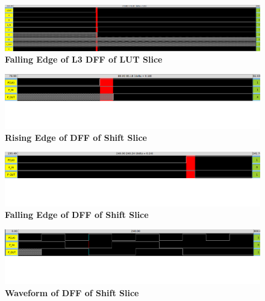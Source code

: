 \documentclass[a4paper]{article}
\begin{document}
    \begin{figure}[H]
        \centering
        \includegraphics[width=\textwidth,height=\textheight,keepaspectratio]{../../irsim/pics/lut_l3_falling.png}
        \caption{\textbf{Falling Edge of L3 DFF of LUT Slice}}
        \label{fig:gg}
    \end{figure}

    \begin{figure}[H]
        \centering
        \includegraphics[width=\textwidth,height=\textheight,keepaspectratio]{../../irsim/pics/shift_rising.png}
        \caption{\textbf{Rising Edge of DFF of Shift Slice}}
        \label{fig:gg}
    \end{figure}
    \begin{figure}[H]
        \centering
        \includegraphics[width=\textwidth,height=\textheight,keepaspectratio]{../../irsim/pics/shift_falling.png}
        \caption{\textbf{Falling Edge of DFF of Shift Slice}}
        \label{fig:gg}
    \end{figure}
    \begin{figure}[H]
        \centering
        \includegraphics[width=\textwidth,height=\textheight,keepaspectratio]{../../irsim/pics/shift_waveform.png}
        \caption{\textbf{Waveform of DFF of Shift Slice}}
        \label{fig:gg}
    \end{figure}
\end{document}

